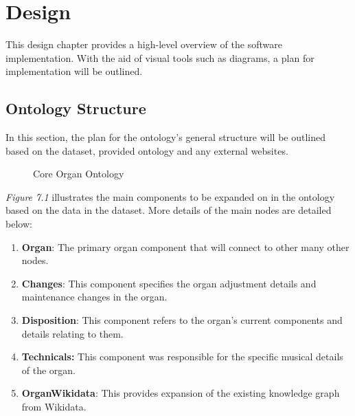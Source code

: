 \chapter{Design}
This design chapter provides a high-level overview of the software implementation. With the aid of visual tools such as diagrams, a plan for implementation will be outlined. 

\section{Ontology Structure}
In this section, the plan for the ontology's general structure will be outlined based on the dataset, provided ontology and any external websites. 

\begin{figure}[H]
    \begin{center}
    \end{center}
    \vspace{-0.4cm}
\caption{Core Organ Ontology}
\end{figure}
\vspace{-0.1cm}

\textit{Figure 7.1} illustrates the main components to be expanded on in the ontology based on the data in the dataset. More details of the main nodes are detailed below:

\begin{enumerate}
    \item \textbf{Organ}: The primary organ component that will connect to other many other nodes.
    \item \textbf{Changes}: This component specifies the organ adjustment details and maintenance changes in the organ.
    \item \textbf{Disposition}: This component refers to the organ's current components and details relating to them.
    \item \textbf{Technicals:} This component was responsible for the specific musical details of the organ. 
    \item \textbf{OrganWikidata}: This provides expansion of the existing knowledge graph from Wikidata.
\end{enumerate}

